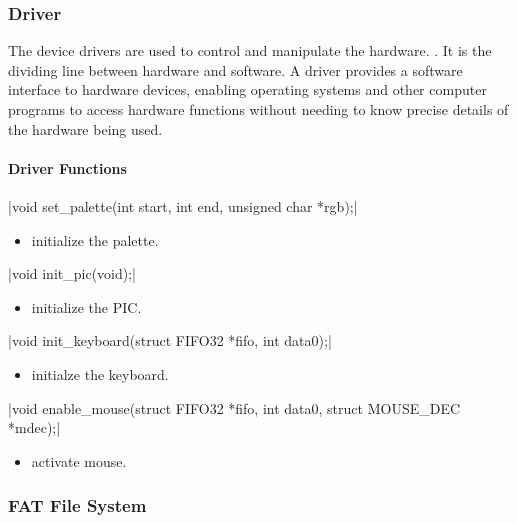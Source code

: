 \documentclass{swfcthesis}
\begin{document}
\subsubsection{Driver}
\label{sec:driver}

The device drivers are used to control and manipulate the
hardware. . It is the
dividing line between hardware and software. A driver provides a software interface to
hardware devices, enabling operating systems and other computer programs to access
hardware functions without needing to know precise details of the hardware being used.

\paragraph{Driver Functions}

\csingle|void set_palette(int start, int end, unsigned char *rgb);|
\begin{itemize}
\item initialize the palette.
\end{itemize}

\csingle|void init_pic(void);|
\begin{itemize}
\item initialize the PIC.
\end{itemize}

\csingle|void init_keyboard(struct FIFO32 *fifo, int data0);|
\begin{itemize}
\item initialze the keyboard.
\end{itemize}

\csingle|void enable_mouse(struct FIFO32 *fifo, int data0, struct MOUSE_DEC *mdec);|
\begin{itemize}
\item activate mouse.
\end{itemize}

\subsubsection{FAT File System}
\label{sec:fat}

  
\end{document}
